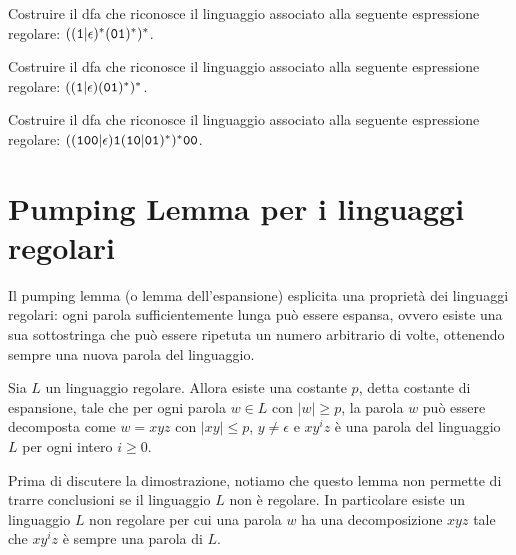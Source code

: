 \begin{Exercise}\label{exe:er-dfa-3}
	Costruire il dfa che riconosce il linguaggio associato alla seguente espressione regolare: $((\mathtt{1}|\epsilon){}^{\ast}(\mathtt{0}\mathtt{1}){}^{\ast}){}^{\ast}$.
\end{Exercise}

\begin{Exercise}\label{exe:er-dfa-4}
	Costruire il dfa che riconosce il linguaggio associato alla seguente espressione regolare: $((\mathtt{1}|\epsilon)(\mathtt{0}\mathtt{1}){}^{\ast}){}^{\ast}$.
\end{Exercise}

\begin{Exercise}\label{exe:er-dfa-5}
	Costruire il dfa che riconosce il linguaggio associato alla seguente espressione regolare: $((\mathtt{1}\mathtt{0}\mathtt{0}|\epsilon)\mathtt{1}(\mathtt{1}\mathtt{0}|\mathtt{0}\mathtt{1}){}^{\ast}){}^{\ast}\mathtt{0}\mathtt{0}$.
\end{Exercise}

\section{Pumping Lemma per i linguaggi regolari}
\label{sec:pumping-lemma-RE}

Il pumping lemma (o lemma dell'espansione) esplicita una proprietà dei linguaggi regolari: ogni parola sufficientemente
lunga può essere espansa, ovvero esiste una sua sottostringa che può essere ripetuta un numero arbitrario di volte,
ottenendo sempre una nuova parola del linguaggio.

\begin{lemma}\label{lem:pumping-lemma}
Sia $L$ un linguaggio regolare.
Allora esiste una costante $p$, detta costante di espansione, tale che per ogni parola $w\in L$ con $|w|\ge p$, la parola $w$ può
essere decomposta come $w=xyz$ con $|xy|\le p$, $y\ne \epsilon$ e $xy^{i}z$ è una parola del linguaggio $L$ per ogni intero $i\ge 0$.
\end{lemma}

Prima di discutere la dimostrazione, notiamo che questo lemma non permette di trarre conclusioni se il linguaggio $L$ non
è regolare.
In particolare esiste un linguaggio $L$ non regolare per cui una parola $w$ ha una decomposizione $xyz$ tale che $xy^{i}z$
è sempre una parola di $L$.

